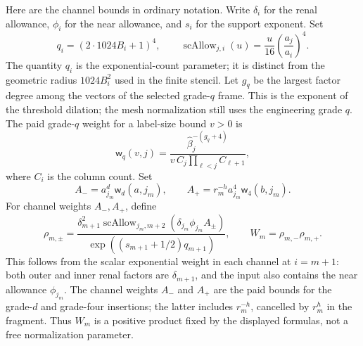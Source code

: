 Here are the channel bounds in ordinary notation. Write $\delta_i$ for the
renal allowance, $\phi_i$ for the near allowance, and $s_i$ for the support
exponent. Set
\[
 q_i=(2\cdot1024B_i+1)^4,\qquad
 \operatorname{scAllow}_{j,i}(u)=\frac{u}{16}\left(\frac{a_j}{a_i}\right)^4.
\]
The quantity $q_i$ is the exponential-count parameter; it is distinct from
the geometric radius $1024B_i^2$ used in the finite stencil. Let $g_q$ be
the largest factor degree among the vectors of the selected grade-$q$
frame. This is the exponent of the threshold dilation; the mesh
normalization still uses the engineering grade $q$. The paid grade-$q$ weight for
a label-size bound $v>0$ is
\[
 \mathsf w_q(v,j)=\frac{\widehat\beta_j^{-(g_q+4)}}
  {v\,C_j\prod_{\ell<j}C_{\ell+1}},
\]
where $C_i$ is the column count. Set
\[
 A_-=a_{j_m}^{d}\mathsf w_d(a,j_m),\qquad
 A_+=r_m^{-h}a_{j_m}^{4}\mathsf w_4(b,j_m).
\]
For channel weights $A_-,A_+$, define
\begin{equation}\label{eq:ex-lattice-shell-picket}
 \rho_{m,\pm}=\frac{\delta_{m+1}^{2}
   \operatorname{scAllow}_{j_m,m+2}
      (\delta_{j_m}\phi_{j_m}A_\pm)}
      {\exp((s_{m+1}+1/2)q_{m+1})},\qquad
 W_m=\rho_{m,-}\rho_{m,+}.
\end{equation}
This follows from the scalar exponential weight in each channel at
$i=m+1$: both outer and inner renal factors are $\delta_{m+1}$, and the
input also contains the near allowance $\phi_{j_m}$. The channel weights $A_-$
and $A_+$ are the paid bounds for the grade-$d$
and grade-four insertions; the latter includes $r_m^{-h}$, cancelled by
$r_m^h$ in the fragment. Thus $W_m$ is a positive product fixed by the
displayed formulas, not a free normalization parameter.

